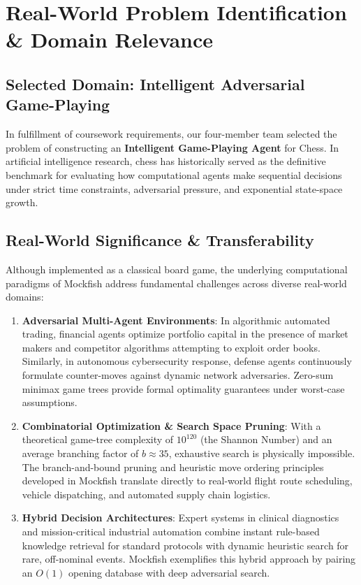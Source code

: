 \documentclass[11pt,a4paper]{article}
\begin{document}
\section{Real-World Problem Identification \& Domain Relevance}

\subsection{Selected Domain: Intelligent Adversarial Game-Playing}
In fulfillment of coursework requirements, our four-member team selected the problem of constructing an \textbf{Intelligent Game-Playing Agent} for Chess. In artificial intelligence research, chess has historically served as the definitive benchmark for evaluating how computational agents make sequential decisions under strict time constraints, adversarial pressure, and exponential state-space growth.

\subsection{Real-World Significance \& Transferability}
Although implemented as a classical board game, the underlying computational paradigms of Mockfish address fundamental challenges across diverse real-world domains:
\begin{enumerate}[leftmargin=*]
    \item \textbf{Adversarial Multi-Agent Environments}: In algorithmic automated trading, financial agents optimize portfolio capital in the presence of market makers and competitor algorithms attempting to exploit order books. Similarly, in autonomous cybersecurity response, defense agents continuously formulate counter-moves against dynamic network adversaries. Zero-sum minimax game trees provide formal optimality guarantees under worst-case assumptions.
    \item \textbf{Combinatorial Optimization \& Search Space Pruning}: With a theoretical game-tree complexity of $10^{120}$ (the Shannon Number) and an average branching factor of $b \approx 35$, exhaustive search is physically impossible. The branch-and-bound pruning and heuristic move ordering principles developed in Mockfish translate directly to real-world flight route scheduling, vehicle dispatching, and automated supply chain logistics.
    \item \textbf{Hybrid Decision Architectures}: Expert systems in clinical diagnostics and mission-critical industrial automation combine instant rule-based knowledge retrieval for standard protocols with dynamic heuristic search for rare, off-nominal events. Mockfish exemplifies this hybrid approach by pairing an $O(1)$ opening database with deep adversarial search.
\end{enumerate}
\end{document}
